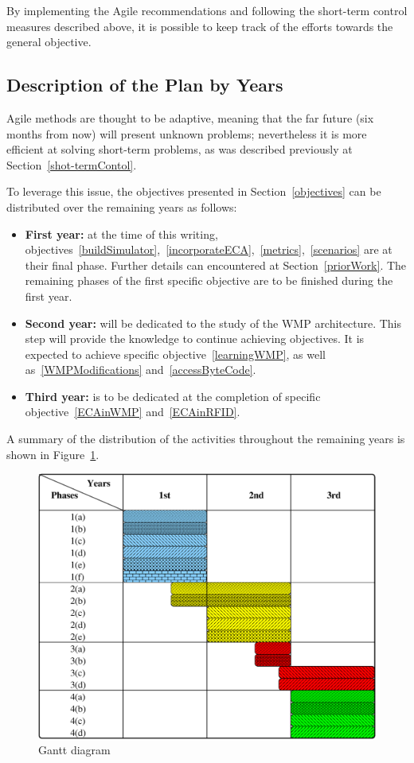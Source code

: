 By implementing the Agile recommendations and following the short-term control measures described above, it is possible to keep track of the efforts towards the general objective.

\subsection{Description of the Plan by Years}\label{planByYears}
Agile methods are thought to be adaptive, meaning that the far future (six months from now) will present unknown problems; nevertheless it is more efficient at solving short-term problems, as was described previously at Section~\ref{shot-termContol}.

To leverage this issue, the objectives presented in Section~\ref{objectives} can be distributed over the remaining years as follows:

\begin{itemize}
	\item {\bfseries First year:} at the time of this writing, objectives~\ref{buildSimulator},~\ref{incorporateECA},~\ref{metrics},~\ref{scenarios} are at their final phase. Further details can encountered at Section~\ref{priorWork}. The remaining phases of the first specific objective are to be finished during the first year.
	\item {\bfseries Second year:} will be dedicated to the study of the WMP architecture. This step will provide the knowledge to continue achieving objectives. It is expected to achieve specific objective~\ref{learningWMP}, as well as~\ref{WMPModifications} and~\ref{accessByteCode}.
	\item {\bfseries Third year:} is to be dedicated at the completion of specific objective~\ref{ECAinWMP} and~\ref{ECAinRFID}.
\end{itemize}

A summary of the distribution of the activities throughout the remaining years is shown in Figure~\ref{fig:gantt}.

\begin{figure}[htbp]
  \centering
  \includegraphics[width=0.95\linewidth]{gantt.eps}
  \caption{Gantt diagram
  \label{fig:gantt}}
\end{figure}